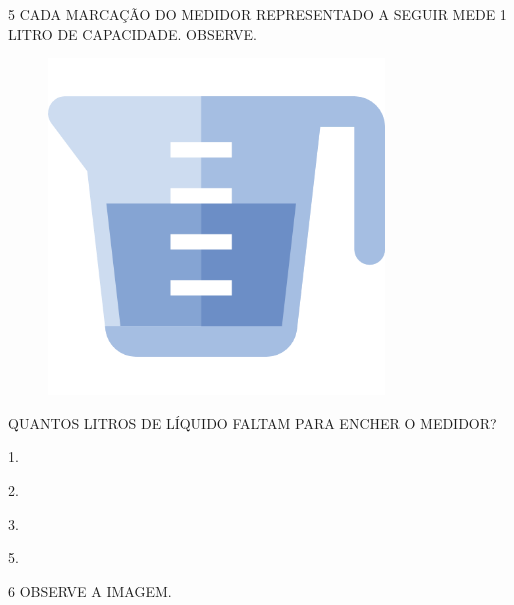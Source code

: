 \pagebreak
\num{5} CADA MARCAÇÃO DO MEDIDOR REPRESENTADO A SEGUIR MEDE 1 LITRO DE CAPACIDADE. OBSERVE.


\begin{figure}[H]
\centering
\includegraphics[width=\textwidth]{media/image113.png}
\end{figure}

QUANTOS LITROS DE LÍQUIDO FALTAM PARA ENCHER O MEDIDOR?

\begin{escolha}[itemsep=0pt]
\item 1.

\item 2.

\item 3.

\item 5.
\end{escolha}

\num{6} OBSERVE A IMAGEM.


